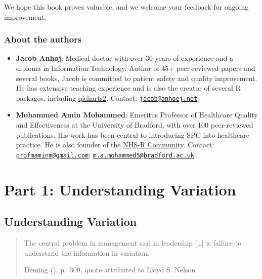 \documentclass[
]{book}
\begin{document}
We hope this book proves valuable, and we welcome your feedback for ongoing improvement.

\section*{About the authors}\label{about-the-authors}

\begin{itemize}
\item
  \textbf{Jacob Anhøj}: Medical doctor with over 30 years of experience and a diploma in Information Technology. Author of 45+ peer-reviewed papers and several books, Jacob is committed to patient safety and quality improvement. He has extensive teaching experience and is also the creator of several R packages, including \href{https://anhoej.github.io/qicharts2/}{qicharts2}.
  Contact: \href{mailto:jacob@anhoej.net}{\nolinkurl{jacob@anhoej.net}}
\item
  \textbf{Mohammed Amin Mohammed}: Emeritus Professor of Healthcare Quality and Effectiveness at the University of Bradford, with over 100 peer-reviewed publications. His work has been central to introducing SPC into healthcare practice. He is also founder of the \href{https://nhsrcommunity.com/}{NHS-R Community}.
  Contact: \href{mailto:profmaminm@gmail.com}{\nolinkurl{profmaminm@gmail.com}}; \href{mailto:m.a.mohammed5@bradford.ac.uk}{\nolinkurl{m.a.mohammed5@bradford.ac.uk}}
\end{itemize}

\part*{Part 1: Understanding Variation}\label{part-part-1-understanding-variation}

\chapter{Understanding Variation}\label{variation}

\begin{quote}
The central problem in management and in leadership {[}\ldots{]} is failure to understand the information in variation.

Deming (), p.~309, quote attributed to Lloyd S. Nelson
\end{quote}
\end{document}
